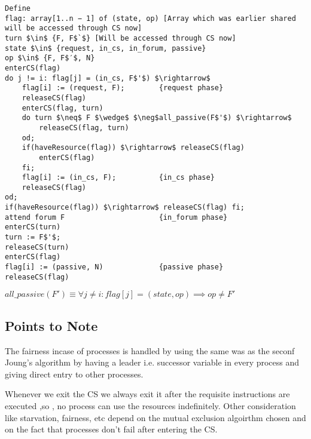 \documentclass[12pt]{article}
\begin{document}
\begin{lstlisting}[mathescape=true]
Define
flag: array[1..n − 1] of (state, op) [Array which was earlier shared will be accessed through CS now]
turn $\in$ {F, F$`$} [Will be accessed through CS now]
state $\in$ {request, in_cs, in_forum, passive}
op $\in$ {F, F$′$, N}
enterCS(flag)
do j != i: flag[j] = (in_cs, F$'$) $\rightarrow$
	flag[i] := (request, F); 		{request phase}
	releaseCS(flag)
	enterCS(flag, turn)
	do turn $\neq$ F $\wedge$ $\neg$all_passive(F$'$) $\rightarrow$
		releaseCS(flag, turn)
	od;
	if(haveResource(flag)) $\rightarrow$ releaseCS(flag)
		enterCS(flag)
	fi;
	flag[i] := (in_cs, F); 			{in_cs phase}
	releaseCS(flag)
od;
if(haveResource(flag)) $\rightarrow$ releaseCS(flag) fi;
attend forum F 						{in_forum phase}
enterCS(turn)
turn := F$'$;
releaseCS(turn)
enterCS(flag)
flag[i] := (passive, N) 			{passive phase}
releaseCS(flag)
\end{lstlisting}

$all\_passive (F') \equiv \forall j \neq i : flag[j] = (state, op) \implies op \neq F'$

\subsection{Points to Note}
The fairness incase of processes is handled by using the same was as the seconf Joung's algorithm by having a leader i.e. successor variable in every process and giving direct entry to other processes.

Whenever we exit the CS we always exit it after the requisite instructions are executed ,so , no process can use the resources indefinitely. 
Other consideration like starvation, fairness, etc depend on the mutual exclusion algoirthm chosen and on the fact that processes don't fail after entering the CS.
\end{document}
